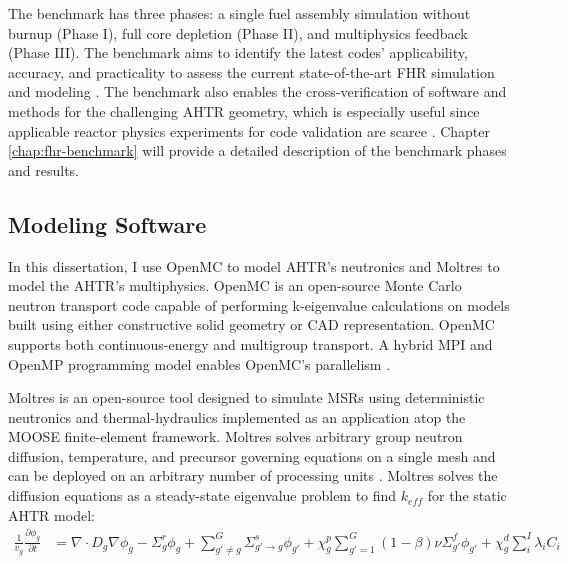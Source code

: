 The benchmark has three phases: a single fuel assembly simulation 
without burnup (Phase I), full core depletion (Phase II), and multiphysics 
feedback (Phase III). 
The benchmark aims to identify the latest codes' applicability, accuracy, 
and practicality to assess the current state-of-the-art FHR simulation 
and modeling \cite{petrovic_preliminary_2021}. 
The benchmark also enables the cross-verification of software and methods 
for the challenging \gls{AHTR} geometry, which is especially useful since 
applicable reactor physics experiments for code validation are scarce 
\cite{petrovic_fhrahtr_2019,petrovic_preliminary_2021}. 
Chapter \ref{chap:fhr-benchmark} will provide a detailed description of the 
benchmark phases and results.

\subsection{Modeling Software}
\label{sec:lit-review-modeling-software}
In this dissertation, I use OpenMC \cite{romano_openmc:_2015} to model \gls{AHTR}'s 
neutronics and Moltres \cite{lindsay_introduction_2018} to model the \gls{AHTR}'s 
multiphysics. 
OpenMC is an open-source Monte Carlo neutron transport code capable of 
performing k-eigenvalue calculations on models built using either constructive 
solid geometry or CAD representation. 
OpenMC supports both continuous-energy and multigroup transport.
A hybrid MPI and OpenMP programming model enables OpenMC's parallelism
\cite{romano_openmc:_2015}.

Moltres is an open-source tool designed to simulate \glspl{MSR} using 
deterministic neutronics and thermal-hydraulics implemented as an application 
atop the \gls{MOOSE} finite-element framework.  
Moltres solves arbitrary group neutron diffusion, temperature, and precursor 
governing equations on a single mesh and can be deployed on an arbitrary number 
of processing units \cite{lindsay_introduction_2018}.
Moltres solves the diffusion equations as a steady-state eigenvalue 
problem to find $k_{eff}$ for the static AHTR model: 
\begin{align}
    \label{eq:moltres-diffusion-equation}
    \frac{1}{v_g} \frac{\partial \phi_g}{\partial t} &= \nabla \cdot D_g
    \nabla \phi_g - \Sigma^r_g \phi_g +
    \sum^G_{g' \neq g} \Sigma^s_{g' \rightarrow g} \phi_{g'} + \chi^p_g
    \sum^G_{g'=1} (1-\beta) \nu \Sigma^f_{g'} \phi_{g'} + \chi^d_g \sum^I_i
    \lambda_i C_i
\end{align}

